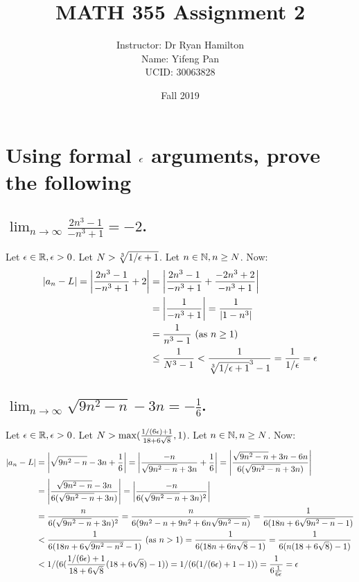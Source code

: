 \documentclass[10pt, letterpaper, titlepage]{article}
\title{MATH 355 Assignment 2}
\author{Instructor: Dr Ryan Hamilton
    \\Name: Yifeng Pan
    \\UCID: 30063828}
\date{Fall 2019}
\newcommand\limntoinfty{\lim_{n \to \infty}}
\begin{document}
    \maketitle
    \section{Using formal $\epsilon$ arguments, prove the following}
      \subsection{${\limntoinfty\frac{2n^3-1}{-n^3+1} = -2}$.}
        Let $\epsilon\in\mathbb{R}, \epsilon > 0$.
        Let $N > \sqrt[3]{1/\epsilon + 1}$.
        Let $n \in \mathbb{N}, n \geq N$.
        Now: 
        \begin{align*}
          \left|a_n - L\right| = \left|\frac{2n^3 - 1}{-n^3 + 1} + 2\right| 
          &= \left|\frac{2n^3 - 1}{-n^3 + 1} + \frac{-2n^3 + 2}{-n^3 + 1}\right| \\ 
          &= \left|\frac{1}{-n^3 + 1}\right| =  \frac{1}{\left|1 - n^3\right|} \\
          &= \frac{1}{n^3 - 1} \text{ (as $n \geq 1$)} \\
          &\leq \frac{1}{N^3 - 1}
          < \frac{1}{\sqrt[3]{1/\epsilon + 1}^3 - 1}
          = \frac{1}{1/\epsilon}
          = \epsilon
        \end{align*}

      \subsection{${\limntoinfty\sqrt{9n^2 -n} - 3n=-\frac{1}{6}}$.}
        Let $\epsilon\in\mathbb{R}, \epsilon > 0$.
        Let $N > \max(\frac{1/(6\epsilon) + 1}{18 + 6\sqrt{8}}, 1)$.
        Let $n \in \mathbb{N}, n \geq N$.
        Now: 
        \begin{align*}
          \left|a_n - L\right| 
          &= \left|\sqrt{9n^2 -n} - 3n + \frac{1}{6}\right| 
          = \left|\frac{- n}{\sqrt{9n^2 -n} + 3n} + \frac{1}{6}\right|
          = \left|\frac{\sqrt{9n^2 -n} + 3n - 6n}{6(\sqrt{9n^2 -n} + 3n)}\right| \\ 
          &= \left|\frac{\sqrt{9n^2 -n} - 3n}{6(\sqrt{9n^2 -n} + 3n)}\right|
          = \left|\frac{-n}{6(\sqrt{9n^2 -n} + 3n)^2}\right| \\ 
          &= \frac{n}{6(\sqrt{9n^2 -n} + 3n)^2}
          = \frac{n}{6(9n^2 -n + 9n^2 + 6n\sqrt{9n^2 -n})}
          = \frac{1}{6(18n + 6\sqrt{9n^2 -n} - 1)} \\ 
          &< \frac{1}{6(18n + 6\sqrt{9n^2 - n^2} - 1)} \text{ (as $n > 1$)}
          = \frac{1}{6(18n + 6n\sqrt{8} - 1)}
          = \frac{1}{6(n(18 + 6\sqrt{8}) - 1)} \\ 
          &< 1/(6(\frac{1/(6\epsilon) + 1}{18 + 6\sqrt{8}}(18 + 6\sqrt{8}) - 1))
          = 1/(6(1/(6\epsilon) + 1 - 1))
          = \frac{1}{6\frac{1}{6\epsilon}} 
          = \epsilon
        \end{align*}
\end{document}
